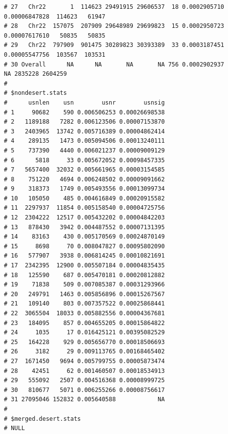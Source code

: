 \documentclass{article}\usepackage[]{graphicx}\usepackage[]{color}
\makeatletter
\newenvironment{kframe}{%
 \def\at@end@of@kframe{}%
 \ifinner\ifhmode%
  \def\at@end@of@kframe{\end{minipage}}%
  \begin{minipage}{\columnwidth}%
 \fi\fi%
 \def\FrameCommand##1{\hskip\@totalleftmargin \hskip-\fboxsep
 \colorbox{shadecolor}{##1}\hskip-\fboxsep
     \hskip-\linewidth \hskip-\@totalleftmargin \hskip\columnwidth}%
 \MakeFramed {\advance\hsize-\width
   \@totalleftmargin\z@ \linewidth\hsize
   \@setminipage}}%
 {\par\unskip\endMakeFramed%
 \at@end@of@kframe}
\newenvironment{knitrout}{}{} %
\makeatother
\begin{document}
\begin{knitrout}
\begin{kframe}
\begin{verbatim}
# 27   Chr22       1  114623 29491915 29606537  18 0.0002905710 0.00006847828  114623   61947
# 28   Chr22  157075  207909 29648989 29699823  15 0.0002950723 0.00007617610   50835   50835
# 29   Chr22  797909  901475 30289823 30393389  33 0.0003187451 0.00005547756  103567  103531
# 30 Overall      NA      NA       NA       NA 756 0.0002902937            NA 2835228 2604259
# 
# $nondesert.stats
#      usnlen    usn        usnr        usnsig
# 1     90682    590 0.006506253 0.00026698538
# 2   1189188   7282 0.006123506 0.00007153870
# 3   2403965  13742 0.005716389 0.00004862414
# 4    289135   1473 0.005094506 0.00013240111
# 5    737390   4440 0.006021237 0.00009009129
# 6      5818     33 0.005672052 0.00098457335
# 7   5657400  32032 0.005661965 0.00003154585
# 8    751220   4694 0.006248502 0.00009091662
# 9    318373   1749 0.005493556 0.00013099734
# 10   105050    485 0.004616849 0.00020915582
# 11  2297937  11854 0.005158540 0.00004725756
# 12  2304222  12517 0.005432202 0.00004842203
# 13   878430   3942 0.004487552 0.00007131395
# 14    83163    430 0.005170569 0.00024870149
# 15     8698     70 0.008047827 0.00095802090
# 16   577907   3938 0.006814245 0.00010821691
# 17  2342395  12900 0.005507184 0.00004835435
# 18   125590    687 0.005470181 0.00020812882
# 19    71838    509 0.007085387 0.00031293966
# 20   249791   1463 0.005856896 0.00015267567
# 21   109140    803 0.007357522 0.00025868441
# 22  3065504  18033 0.005882556 0.00004367681
# 23   184095    857 0.004655205 0.00015864822
# 24     1035     17 0.016425121 0.00395082529
# 25   164228    929 0.005656770 0.00018506693
# 26     3182     29 0.009113765 0.00168465402
# 27  1671450   9694 0.005799755 0.00005873474
# 28    42451     62 0.001460507 0.00018534913
# 29   555092   2507 0.004516368 0.00008999725
# 30   810677   5071 0.006255266 0.00008756617
# 31 27095046 152832 0.005640588            NA
# 
# $merged.desert.stats
# NULL
\end{verbatim}
\end{kframe}
\end{knitrout}
\end{document}
